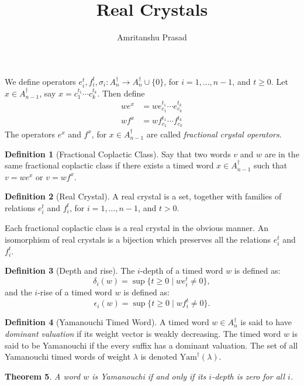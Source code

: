 \documentclass[12pt]{amsproc}
\title{Real Crystals}
\author{Amritanshu Prasad}
\newcommand{\Yam}{\mathrm{Yam}}
\newtheorem{theorem}{Theorem}
\theoremstyle{definition}
\newtheorem{definition}[theorem]{Definition}
\begin{document}
\maketitle
We define operators $e_i^t, f_i^t, \sigma_i:A_n^\dagger\to A_n^\dagger\cup \{0\}$, for $i=1,\dotsc,n-1$, and $t\geq 0$.
Let $x\in A_{n-1}^\dagger$, say $x=c_1^{t_1}\dotsb c_k^{t_k}$.
Then define
\begin{align*}
  we^x & = w e_{c_1}^{t_1}\dotsb e_{c_k}^{t_k}\\
  w f^x & = w f_{c_1}^{t_1}\dotsb f_{c_k}^{t_k}
\end{align*}
The operators $e^x$ and $f^x$, for $x\in A_{n-1}^\dagger$ are called \emph{fractional crystal operators}.
\begin{definition}[Fractional Coplactic Class]
  Say that two words $v$ and $w$ are in the same fractional coplactic class if there exists a timed word $x\in A_{n-1}^\dagger$ such that $v=we^x$ or $v=wf^x$.
\end{definition}
\begin{definition}[Real Crystal]
  A real crystal is a set, together with families of relations $e_i^t$ and $f_i^t$, for $i=1,\dotsc,n-1$, and $t>0$.
\end{definition}
Each fractional coplactic class is a real crystal in the obvious manner.
An isomorphism of real crystals is a bijection which preserves all the relations $e_i^t$ and $f_i^t$.
\begin{definition}
  [Depth and rise]
  The $i$-depth of a timed word $w$ is defined as:
  \begin{displaymath}
    \delta_i(w)=\sup\{t\geq 0\mid we_i^t\neq 0\},
  \end{displaymath}
  and the $i$-rise of a timed word $w$ is defined as:
  \begin{displaymath}
    \epsilon_i(w) = \sup\{t\geq 0\mid wf_i^t\neq 0\}.
  \end{displaymath}
\end{definition}
\begin{definition}
  [Yamanouchi Timed Word]
  A timed word $w\in A_n^\dagger$ is said to have \emph{dominant valuation} if its weight vector is weakly decreasing.
  The timed word $w$ is said to be Yamanouchi if the every suffix has a dominant valuation.
  The set of all Yamanouchi timed words of weight $\lambda$ is denoted $\Yam^\dagger(\lambda)$.
\end{definition}
\begin{theorem}
  A word $w$ is Yamanouchi if and only if its $i$-depth is zero for all $i$.
\end{theorem}
\end{document}
